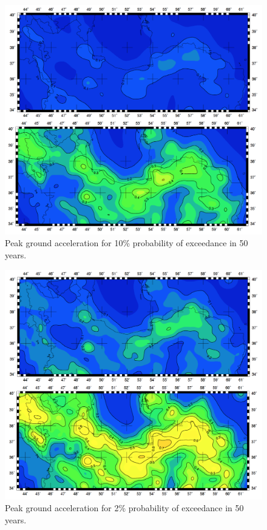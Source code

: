 \begin{figure} [!ht]
\centering
\includegraphics[scale=0.3]{figures/pdf/pga_10_mean.pdf} 
\caption{Peak ground acceleration for 10\% probability of exceedance in 50 years.}
\label{fig:pga_10_mean}
\end{figure}

\begin{figure} [!ht]
\centering
\includegraphics[scale=0.3]{figures/pdf/pga_2_mean.pdf} 
\caption{Peak ground acceleration for 2\% probability of exceedance in 50 years.}
\label{fig:pga_2_mean}
\end{figure}

